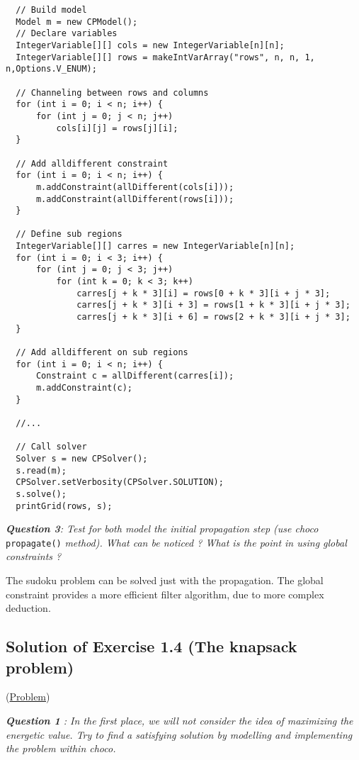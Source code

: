 \begin{lstlisting}
  // Build model
  Model m = new CPModel();
  // Declare variables
  IntegerVariable[][] cols = new IntegerVariable[n][n];
  IntegerVariable[][] rows = makeIntVarArray("rows", n, n, 1, n,Options.V_ENUM);
  
  // Channeling between rows and columns
  for (int i = 0; i < n; i++) {
      for (int j = 0; j < n; j++)
          cols[i][j] = rows[j][i];
  }
	
  // Add alldifferent constraint
  for (int i = 0; i < n; i++) {
      m.addConstraint(allDifferent(cols[i]));
      m.addConstraint(allDifferent(rows[i]));
  }

  // Define sub regions
  IntegerVariable[][] carres = new IntegerVariable[n][n];
  for (int i = 0; i < 3; i++) {
      for (int j = 0; j < 3; j++)
          for (int k = 0; k < 3; k++)
              carres[j + k * 3][i] = rows[0 + k * 3][i + j * 3];
              carres[j + k * 3][i + 3] = rows[1 + k * 3][i + j * 3];
              carres[j + k * 3][i + 6] = rows[2 + k * 3][i + j * 3];
  }
	
  // Add alldifferent on sub regions
  for (int i = 0; i < n; i++) {
      Constraint c = allDifferent(carres[i]);
      m.addConstraint(c);
  }
  
  //...
	
  // Call solver
  Solver s = new CPSolver();
  s.read(m);
  CPSolver.setVerbosity(CPSolver.SOLUTION);
  s.solve();
  printGrid(rows, s);
\end{lstlisting} 

\noindent\emph{\textbf{Question 3}: Test for both model the initial propagation step (use choco} \texttt{propagate()} \emph{method). What can be noticed ? What is the point in using global constraints ?}

The sudoku problem can be solved just with the propagation. 
The global constraint provides a more efficient filter algorithm, due to more complex deduction.

\subsection{Solution of Exercise 1.4 (The knapsack problem)}\label{solutions:solutionofexercise1.4}\hypertarget{solutions:solutionofexercise1.4}{}

(\hyperlink{exercises:exercise1.4}{Problem})

\noindent\emph{\textbf{Question 1} : In the first place, we will not consider the idea of maximizing the energetic value. Try to find a satisfying solution by modelling and implementing the problem within choco.}


